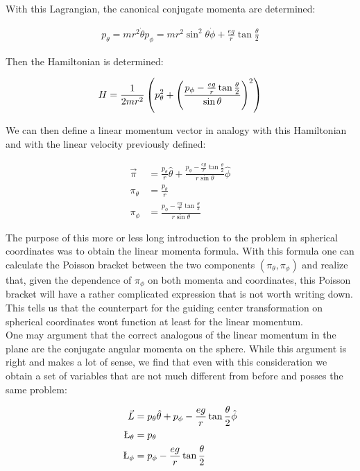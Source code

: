 With this Lagrangian, the canonical conjugate momenta are determined:

\begin{align*}
p_\theta = mr^2\dot{\theta}
p_\phi = mr^2\sin^2\theta\dot{\phi} + \frac{eg}{r}\tan{\frac{\theta}{2}}
\end{align*}

Then the Hamiltonian is determined:

\begin{equation}
H = \frac{1}{2mr^2}\left( p_\theta^2 + \left( \frac{p_\phi - \frac{eg}{r}\tan{\frac{\theta}{2}}}{\sin\theta} \right)^2 \right)
\end{equation}

We can then define a linear momentum vector in analogy with this Hamiltonian and with the linear velocity previously defined:

\begin{align*}
\vec{\pi} &= \frac{p_\theta}{r}\hat{\theta} + \frac{p_\phi - \frac{eg}{r}\tan{\frac{\theta}{2}}}{r\sin\theta}\hat{\phi}\\
\pi_\theta &= \frac{p_\theta}{r}\\
\pi_\phi &= \frac{p_\phi - \frac{eg}{r}\tan{\frac{\theta}{2}}}{r\sin\theta}
\end{align*}

The purpose of this more or less long introduction to the problem in spherical coordinates was to obtain the linear momenta formula. With this formula one can calculate the Poisson bracket between the two components $(\pi_\theta,\pi_\phi)$ and realize that, given the dependence of $\pi_\phi$ on both momenta and coordinates, this Poisson bracket will have a rather complicated expression that is not worth writing down. This tells us that the counterpart for the guiding center transformation on spherical coordinates wont function at least for the linear momentum. \\

One may argument that the correct analogous of the linear momentum in the plane are the conjugate angular momenta on the sphere. While this argument is right and makes a lot of sense, we find that even with this consideration we obtain a set of variables that are not much different from before and posses the same problem:

\begin{align*}
\vec{L} &= p_\theta\hat{\theta} + p_\phi - \frac{eg}{r}\tan{\frac{\theta}{2}}\hat{\phi}\\
\L_\theta &= p_\theta\\
\L_\phi &= p_\phi - \frac{eg}{r}\tan{\frac{\theta}{2}}
\end{align*}


